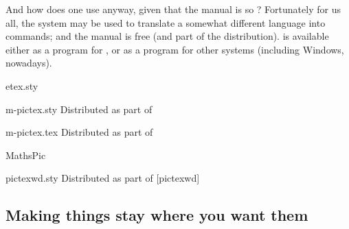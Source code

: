 And how does one use \pictex{} anyway, given that the
manual is so ?
Fortunately for us all, the 
system may be used to translate a somewhat different language into
\pictex{} commands; and the  manual is free (and
part of the distribution).   is available either as
a  program for , or as a 
program for other systems (including Windows, nowadays).
\begin{ctanrefs}
\item[etex.sty]
\item[m-pictex.sty]Distributed as part of 
\item[m-pictex.tex]Distributed as part of 
\item[MathsPic]
\item[pictexwd.sty]Distributed as part of [pictexwd]
\end{ctanrefs}

\subsection{Making things stay where you want them}


